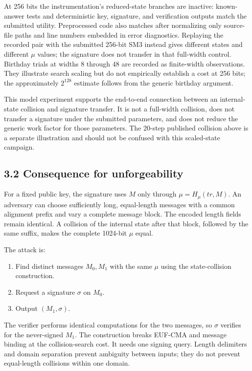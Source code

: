 \documentclass[
  american,
  10pt,
  a4paper,
]{article}
\providecommand{\tightlist}{%
  \setlength{\itemsep}{0pt}\setlength{\parskip}{0pt}}
\begin{document}
At 256 bits the instrumentation's reduced-state branches are inactive:
known-answer tests and deterministic key, signature, and verification
outputs match the submitted utility. Preprocessed code also matches
after normalizing only source-file paths and line numbers embedded in
error diagnostics. Replaying the recorded pair with the submitted
256-bit SM3 instead gives different states and different \(\mu\) values;
the signature does not transfer in that full-width control. Birthday
trials at widths 8 through 48 are recorded as finite-width observations.
They illustrate search scaling but do not empirically establish a cost
at 256 bits; the approximately \(2^{128}\) estimate follows from the
generic birthday argument.

This model experiment supports the end-to-end connection between an
internal-state collision and signature transfer. It is not a full-width
collision, does not transfer a signature under the submitted parameters,
and does not reduce the generic work factor for those parameters. The
20-step published collision above is a separate illustration and should
not be confused with this scaled-state campaign.

\subsection{3.2 Consequence for
unforgeability}\label{consequence-for-unforgeability}

For a fixed public key, the signature uses \(M\) only through
\(\mu=H_\mu(tr,M)\). An adversary can choose sufficiently long,
equal-length messages with a common alignment prefix and vary a complete
message block. The encoded length fields remain identical. A collision
of the internal state after that block, followed by the same suffix,
makes the complete 1024-bit \(\mu\) equal.

The attack is:

\begin{enumerate}
\def\labelenumi{\arabic{enumi}.}
\tightlist
\item
  Find distinct messages \(M_0,M_1\) with the same \(\mu\) using the
  state-collision construction.
\item
  Request a signature \(\sigma\) on \(M_0\).
\item
  Output \((M_1,\sigma)\).
\end{enumerate}

The verifier performs identical computations for the two messages, so
\(\sigma\) verifies for the never-signed \(M_1\). The construction
breaks EUF-CMA and message binding at the collision-search cost. It
needs one signing query. Length delimiters and domain separation prevent
ambiguity between inputs; they do not prevent equal-length collisions
within one domain.
\end{document}
